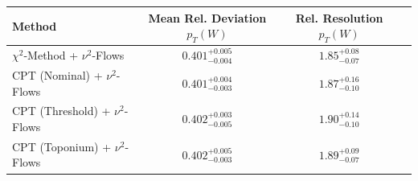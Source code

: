     \begin{tabular}{lccc}
        \toprule
        Method & Mean Rel. Deviation $p_{T}(W)$ & Rel. Resolution $p_{T}(W)$ \\
        \midrule
        $\chi^2$-Method + $\nu^2$-Flows & $0.401^{+0.005}_{-0.004}$ & $1.85^{+0.08}_{-0.07}$ \\
        CPT (Nominal) + $\nu^2$-Flows & $0.401^{+0.004}_{-0.003}$ & $1.87^{+0.16}_{-0.10}$ \\
        CPT (Threshold) + $\nu^2$-Flows & $0.402^{+0.003}_{-0.005}$ & $1.90^{+0.14}_{-0.10}$ \\
        CPT (Toponium) + $\nu^2$-Flows & $0.402^{+0.005}_{-0.003}$ & $1.89^{+0.09}_{-0.07}$ \\
        \bottomrule
    \end{tabular}